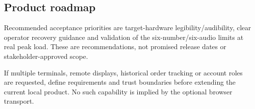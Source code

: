 \subsection{Product roadmap}

Recommended acceptance priorities are target-hardware legibility/audibility, clear operator recovery guidance and validation of the six-number/six-audio limits at real peak load. These are recommendations, not promised release dates or stakeholder-approved scope.

If multiple terminals, remote displays, historical order tracking or account roles are requested, define requirements and trust boundaries before extending the current local product. No such capability is implied by the optional browser transport.
